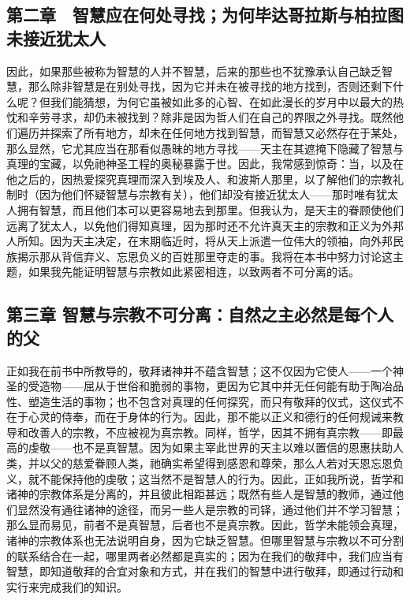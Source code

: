 
\subsection{第二章　智慧应在何处寻找；为何毕达哥拉斯与柏拉图未接近犹太人}

因此，如果那些被称为智慧的人并不智慧，后来的那些也不犹豫承认自己缺乏智慧，那么除非智慧是在别处寻找，因为它并未在被寻找的地方找到，否则还剩下什么呢？但我们能猜想，为何它虽被如此多的心智、在如此漫长的岁月中以最大的热忱和辛劳寻求，却仍未被找到？除非是因为哲人们在自己的界限之外寻找。既然他们遍历并探索了所有地方，却未在任何地方找到智慧，而智慧又必然存在于某处，那么显然，它尤其应当在那看似愚昧的地方寻找——天主在其遮掩下隐藏了智慧与真理的宝藏，以免祂神圣工程的奥秘暴露于世。因此，我常感到惊奇：当，以及在他之后的，因热爱探究真理而深入到埃及人、和波斯人那里，以了解他们的宗教礼制时（因为他们怀疑智慧与宗教有关），他们却没有接近犹太人——那时唯有犹太人拥有智慧，而且他们本可以更容易地去到那里。但我认为，是天主的眷顾使他们远离了犹太人，以免他们得知真理，因为那时还不允许真天主的宗教和正义为外邦人所知。因为天主决定，在末期临近时，将从天上派遣一位伟大的领袖，向外邦民族揭示那从背信弃义、忘恩负义的百姓那里夺走的事。我将在本书中努力讨论这主题，如果我先能证明智慧与宗教如此紧密相连，以致两者不可分离的话。\par


\subsection{第三章 智慧与宗教不可分离：自然之主必然是每个人的父}

正如我在前书中所教导的，敬拜诸神并不蕴含智慧；这不仅因为它使人——一个神圣的受造物——屈从于世俗和脆弱的事物，更因为它其中并无任何能有助于陶冶品性、塑造生活的事物；也不包含对真理的任何探究，而只有敬拜的仪式，这仪式不在于心灵的侍奉，而在于身体的行为。因此，那不能以正义和德行的任何规诫来教导和改善人的宗教，不应被视为真宗教。同样，哲学，因其不拥有真宗教——即最高的虔敬——也不是真智慧。因为如果主宰此世界的天主以难以置信的恩惠扶助人类，并以父的慈爱眷顾人类，祂确实希望得到感恩和尊荣，那么人若对天恩忘恩负义，就不能保持他的虔敬；这当然不是智慧人的行为。因此，正如我所说，哲学和诸神的宗教体系是分离的，并且彼此相距甚远；既然有些人是智慧的教师，通过他们显然没有通往诸神的途径，而另一些人是宗教的司铎，通过他们并不学习智慧；那么显而易见，前者不是真智慧，后者也不是真宗教。因此，哲学未能领会真理，诸神的宗教体系也无法说明自身，因为它缺乏智慧。但哪里智慧与宗教以不可分割的联系结合在一起，哪里两者必然都是真实的；因为在我们的敬拜中，我们应当有智慧，即知道敬拜的合宜对象和方式，并在我们的智慧中进行敬拜，即通过行动和实行来完成我们的知识。\par

